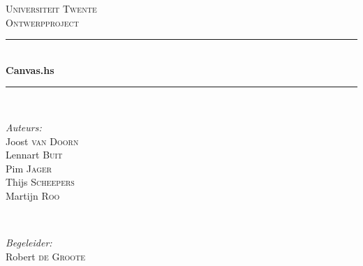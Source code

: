 \begin{titlepage}

\newcommand{\HRule}{\rule{\linewidth}{0.5mm}} %

\center %
\vspace*{\fill}
 

\textsc{\LARGE Universiteit Twente}\\[1.5cm] %
\textsc{\Large Ontwerpproject}\\[2.0cm] %


\HRule \\[0.6cm]
{ \huge \bfseries Canvas.hs}\\[0.4cm] %
\HRule \\[1.8cm]
 

\begin{minipage}[t]{0.4\textwidth}
\begin{flushleft} \large
\emph{Auteurs:}\\
Joost \textsc{van Doorn}\\
Lennart \textsc{Buit}\\
Pim \textsc{Jager}\\
Thijs \textsc{Scheepers}\\
Martijn \textsc{Roo}
\end{flushleft}
\end{minipage}
~
\begin{minipage}[t]{0.4\textwidth}
\begin{flushright} \large
\emph{Begeleider:} \\
Robert \textsc{de Groote}
\end{flushright}
\end{minipage}\\[4cm]


\end{titlepage}
